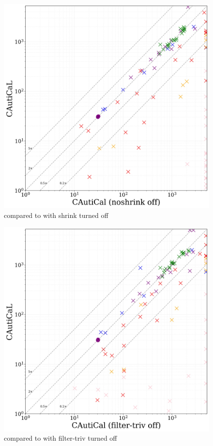 \begin{subfigure}[t]{0.3\textwidth}
    \centering
    \includegraphics[width=\textwidth]{figs/globalnoshrink_heuristic_comparison.jpg}
    \caption{\tool compared to \tool with \textsf{shrink} turned off}
    \label{fig:global-no-shrink}
\end{subfigure}
\hfill
\begin{subfigure}[t]{0.3\textwidth}
    \centering
    \includegraphics[width=\textwidth]{figs/globaldontfilter_heuristic_comparison.jpg}
    \caption{\tool compared to \tool with \textsf{filter-triv} turned off}
    \label{fig:globaldontfilter}
\end{subfigure}
